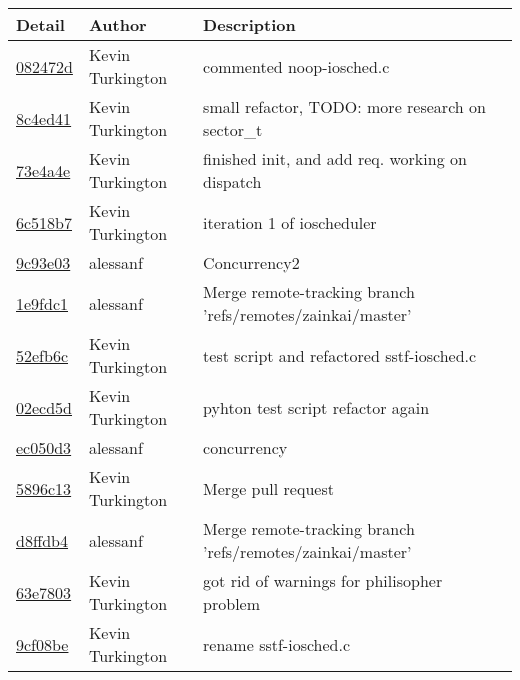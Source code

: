 \begin{tabular}{l l l}\textbf{Detail} & \textbf{Author} & \textbf{Description}\\\hline
\href{https://github.com/zainkai/CS444/commit/082472dde2fe186f09cd9bf06b557b9a8b56b265}{082472d} & Kevin Turkington & commented noop-iosched.c\\\hline
\href{https://github.com/zainkai/CS444/commit/8c4ed41b10d7c585c106477680516dd291e98ec7}{8c4ed41} & Kevin Turkington & small refactor, TODO: more research on sector_t\\\hline
\href{https://github.com/zainkai/CS444/commit/73e4a4e9d21e75e002087a62d208a37df3014d80}{73e4a4e} & Kevin Turkington & finished init, and add req. working on dispatch\\\hline
\href{https://github.com/zainkai/CS444/commit/6c518b727f088451847a1857d7952c172599fb6a}{6c518b7} & Kevin Turkington & iteration 1 of ioscheduler\\\hline
\href{https://github.com/zainkai/CS444/commit/9c93e035b4f999d545d1042e9fca84af75c67e1c}{9c93e03} & alessanf & Concurrency2\\\hline
\href{https://github.com/zainkai/CS444/commit/1e9fdc18e60d560a1bce56689dc7b88b48d3ee65}{1e9fdc1} & alessanf & Merge remote-tracking branch 'refs/remotes/zainkai/master'\\\hline
\href{https://github.com/zainkai/CS444/commit/52efb6c6a26d63c6ae590cced4842ceda9220632}{52efb6c} & Kevin Turkington & test script and refactored sstf-iosched.c\\\hline
\href{https://github.com/zainkai/CS444/commit/02ecd5dbac0a615e4859d151d391a3f79542b4bc}{02ecd5d} & Kevin Turkington & pyhton test script refactor again\\\hline
\href{https://github.com/zainkai/CS444/commit/ec050d3c45c94a1af43b9a46f329439cb7f620d7}{ec050d3} & alessanf & concurrency\\\hline
\href{https://github.com/zainkai/CS444/commit/5896c1343c669ef643b81e8f47bc73702288b584}{5896c13} & Kevin Turkington & Merge pull request #1 from alessanf/master\\\hline
\href{https://github.com/zainkai/CS444/commit/d8ffdb49b3b7a0d52b5ce0058a2458c3a6b6616f}{d8ffdb4} & alessanf & Merge remote-tracking branch 'refs/remotes/zainkai/master'\\\hline
\href{https://github.com/zainkai/CS444/commit/63e78034b4462fb25da71865ebb9ad9ab38d782a}{63e7803} & Kevin Turkington & got rid of warnings for philisopher problem\\\hline
\href{https://github.com/zainkai/CS444/commit/9cf08be31e6a0fd8ac95429369365666d7e908dc}{9cf08be} & Kevin Turkington & rename sstf-iosched.c\\\hline

\end{tabular}
